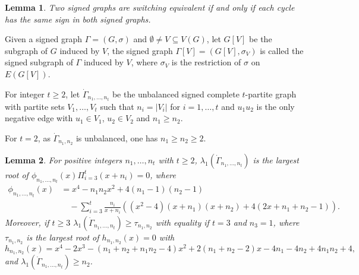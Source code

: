 \documentclass[10pt,a4paper]{amsart}
\numberwithin{equation}{section}
\newtheorem {Lemma}{Lemma}[section]
\begin{document}
\begin{Lemma}\label{SE}\cite{Z1}
Two signed graphs  are switching equivalent if and only if each cycle has the same sign in both signed graphs.
\end{Lemma}







Given a signed graph $\Gamma=(G, \sigma)$ and $\emptyset\ne V\subseteq V(G)$, let $G[V]$ be the subgraph of $G$ induced by $V$,  the signed graph $\Gamma[V]=(G[V], \sigma_V)$ is called the signed subgraph of $\Gamma$  induced by $V$, where $\sigma_V$ is the restriction of $\sigma$ on $E(G[V])$.

For integer  $t\ge 2$, let $\dot\Gamma_{n_1, \dots, n_t}$ be the  unbalanced signed complete  $t$-partite graph with partite sets  $V_1, \dots, V_t$ such that $n_i=|V_i|$ for $i=1, \dots, t$ and  $u_1u_2$ is the only negative edge with  $u_1\in V_1$, $u_2\in V_2$ and $n_1\ge n_2$. 

 For $t=2$, as $\dot\Gamma_{n_1,  n_2}$ is  unbalanced, one has $n_1\ge n_2\ge 2$.

\begin{Lemma}\label{gnt} For positive integers $n_1,\dots, n_t$ with $t\ge 2$, 
$\lambda_1(\dot\Gamma_{n_1, \dots, n_t})$ is the largest root of $\phi_{n_1,\dots, n_t}(x)\Pi_{i=3}^t(x+n_i)=0$, where 
\begin{align*}\phi_{n_1,\dots, n_t}(x)&=x^4-n_1n_2x^2+4(n_1-1)(n_2-1) \\
& \quad -\sum_{i=3}^{t}\frac{n_i}{x+n_i}\left((x^2-4)(x+n_1)(x+n_2)+4(2x+n_1+n_2-1)\right). 
\end{align*} 
Moreover, if $t\ge 3$ $\lambda_1(\dot\Gamma_{n_1, \dots, n_t})\ge \tau_{n_1,n_2}$ with equality if $t=3$ and $n_3=1$, 
where $\tau_{n_1,n_2}$ is the largest root of $h_{n_1,n_2}(x)=0$ with 
\[
h_{n_1,n_2}(x)=x^4-2x^3-(n_1+n_2+n_1n_2-4)x^2+2(n_1+n_2-2)x-4n_1-4n_2+4n_1n_2+4, 
\]
and $\lambda_1(\dot\Gamma_{n_1, \dots, n_t})\ge n_2$. 
\end{Lemma}
\end{document}
